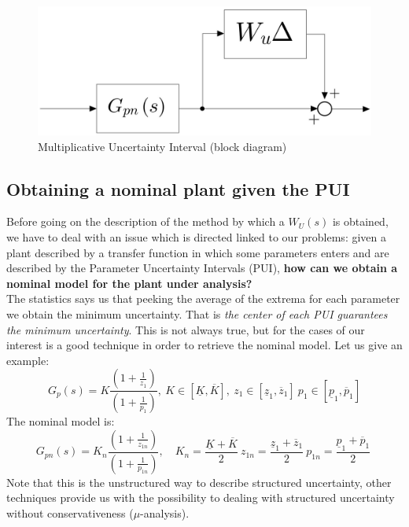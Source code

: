 \documentclass[a4paper, 12pt]{article}
\begin{document}
    \begin{figure}[h]
        \centering
        \includegraphics[scale=0.2]{img/Multiplicative.jpeg}
        \caption{Multiplicative Uncertainty Interval (block diagram)}
    \end{figure}


    \subsection{Obtaining a nominal plant given the PUI}
    Before going on the description of the method by which a $W_U(s)$ is obtained, we have to deal with an issue which is directed linked to our problems: given a plant described by a transfer function in which some parameters enters and are described by the Parameter Uncertainty Intervals (PUI), \textbf{how can we obtain a nominal model for the plant under analysis?} \\
    The statistics says us that peeking the average of the extrema for each parameter we obtain the minimum uncertainty. That is \textit{the center of each PUI guarantees the minimum uncertainty}. This is not always true, but for the cases of our interest is a good technique in order to retrieve the nominal model. Let us give an example:
    \begin{equation}
        G_p(s) = K \frac{(1+\frac{1}{z_1})}{(1+\frac{1}{p_1})}, \ 
        K \in [\underline{K}, \overline{K}], \
        z_1 \in [\underline{z}_1, \overline{z}_1]\
        p_1 \in [\underline{p}_1, \overline{p}_1]
    \end{equation}
    The nominal model is:
    \begin{equation}
        G_{pn}(s) = K_n \frac{(1+\frac{1}{z_{1n}})}{(1+\frac{1}{p_{1n}})}, \quad
        K_n = \frac{\underline{K}+ \overline{K}}{2} \ 
        z_{1n} = \frac{\underline{z}_1+ \overline{z}_1}{2} \ 
        p_{1n} = \frac{\underline{p}_1+\overline{p}_1}{2} \ 
    \end{equation}
    Note that this is the unstructured way to describe structured uncertainty, other techniques provide us with the possibility to dealing with structured uncertainty without conservativeness ($\mu$-analysis).
\end{document}
